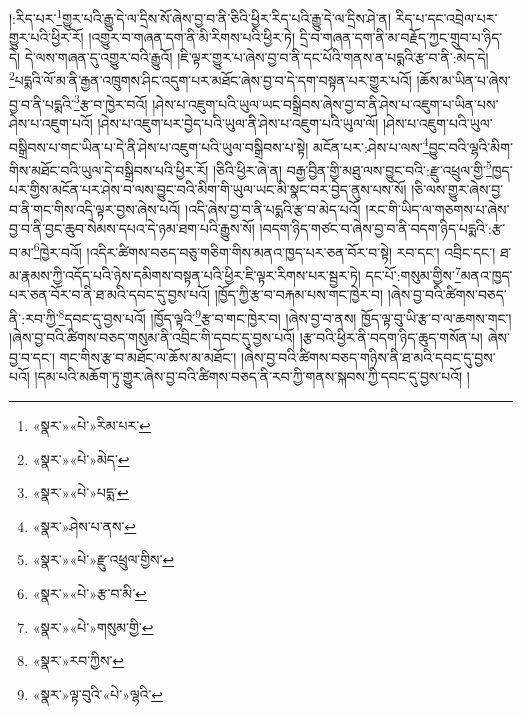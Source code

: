 །:རིད་པར་\footnote{«སྣར་»«པེ་»རིམ་པར་}གྱུར་པའི་རྒྱུ་དེ་ལ་དྲིས་སོ་ཞེས་བྱ་བ་ནི་ཅིའི་ཕྱིར་རིད་པའི་རྒྱུ་དེ་ལ་དྲིས་ཤེ་ན། རིད་པ་དང་འབྲེལ་པར་གྱུར་པའི་ཕྱིར་རོ། །འགྱུར་བ་གཞན་དག་ནི་མི་རིགས་པའི་ཕྱིར་ཏེ། དྲི་བ་གཞན་དག་ནི་མ་བརྗོད་ཀྱང་གྲུབ་པ་ཉིད་དེ། དེ་ལས་གཞན་དུ་འགྱུར་བའི་རྒྱུའོ། །ཇི་ལྟར་གྱུར་པ་ཞེས་བྱ་བ་ནི་དང་པོའི་གནས་ན་པདྨའི་རྩ་བ་ནི་:མེད་དེ། \footnote{«སྣར་»«པེ་»མེད་}པདྨའི་ལོ་མ་ནི་རྒྱན་འཁྲུགས་ཤིང་འདུག་པར་མཐོང་ཞེས་བྱ་བ་དེ་དག་བསྟན་པར་གྱུར་པའོ། །ཆོས་མ་ཡིན་པ་ཞེས་བྱ་བ་ནི་པདྨའི་\footnote{«སྣར་»«པེ་»པདྨ་}རྩ་བ་ཁྱེར་བའོ། །ཤེས་པ་འཇུག་པའི་ཡུལ་ཡང་བསྒྲིབས་ཞེས་བྱ་བ་ནི་ཤེས་པ་འཇུག་པ་ཡིན་པས་ཤེས་པ་འཇུག་པའོ། །ཤེས་པ་འཇུག་པར་བྱེད་པའི་ཡུལ་ནི་ཤེས་པ་འཇུག་པའི་ཡུལ་ལོ། །ཤེས་པ་འཇུག་པའི་ཡུལ་བསྒྲིབས་པ་གང་ཡིན་པ་དེ་ནི་ཤེས་པ་འཇུག་པའི་ཡུལ་བསྒྲིབས་པ་སྟེ། མངོན་པར་:ཤེས་པ་ལས་\footnote{«སྣར་»ཤེས་པ་ནས་}བྱུང་བའི་ལྷའི་མིག་གིས་མཐོང་བའི་ཡུལ་དེ་བསྒྲིབས་པའི་ཕྱིར་རོ། །ཅིའི་ཕྱིར་ཞེ་ན། བརྒྱ་བྱིན་གྱི་མཐུ་ལས་བྱུང་བའི་:རྫུ་འཕྲུལ་གྱི་\footnote{«སྣར་»«པེ་»རྫུ་འཕྲུལ་གྱིས་}ཁྱད་པར་གྱིས་མངོན་པར་ཤེས་བ་ལས་བྱུང་བའི་མིག་གི་ཡུལ་ཡང་མི་སྣང་བར་བྱེད་ནུས་པས་སོ། །ཅི་ལས་གྱུར་ཞེས་བྱ་བ་ནི་གང་གིས་འདི་ལྟར་བྱས་ཞེས་པའོ། །འདི་ཞེས་བྱ་བ་ནི་པདྨའི་རྩ་བ་མེད་པའོ། །རང་གི་ཡིད་ལ་གཅགས་པ་ཞེས་བྱ་བ་ནི་བྱང་ཆུབ་སེམས་དཔའ་དེ་ཉམ་ཐག་པའི་རྒྱུས་སོ། །བདག་ཉིད་གཙང་བ་ཞེས་བྱ་བ་ནི་བདག་ཉིད་པདྨའི་:རྩ་བ་མ་\footnote{«སྣར་»«པེ་»རྩ་བ་མི་}ཁྱེར་བའོ། །འདིར་ཚིགས་བཅད་བཅུ་གཅིག་གིས་མནའ་ཁྱད་པར་ཅན་བོར་བ་སྟེ། རབ་དང་། འབྲིང་དང་། ཐ་མ་རྣམས་ཀྱི་འདོད་པའི་ཉེས་དམིགས་བསྟན་པའི་ཕྱིར་ཇི་ལྟར་རིགས་པར་སྦྱར་ཏེ། དང་པོ་:གསུམ་གྱིས་\footnote{«སྣར་»«པེ་»གསུམ་གྱི་}མནའ་ཁྱད་པར་ཅན་བོར་བ་ནི་ཐ་མའི་དབང་དུ་བྱས་པའོ། །ཁྱོད་ཀྱི་རྩ་བ་བརྐམ་པས་གང་ཁྱེར་བ། །ཞེས་བྱ་བའི་ཚིགས་བཅད་ནི་:རབ་ཀྱི་\footnote{«སྣར་»རབ་ཀྱིས་}དབང་དུ་བྱས་པའོ། །ཁྱོད་ལྟའི་\footnote{«སྣར་»ལྟ་བུའི་«པེ་»ལྷའི་}རྩ་བ་གང་ཁྱེར་བ། །ཞེས་བྱ་བ་ནས། ཁྱོད་ལྟ་བུ་ཡི་རྩ་བ་ལ་ཆགས་གང་། །ཞེས་བྱ་བའི་ཚིགས་བཅད་གསུམ་ནི་འབྲིང་གི་དབང་དུ་བྱས་པའོ། །རྩ་བའི་ཕྱིར་ནི་བདག་ཉིད་ཆུད་གསོན་པ། ཞེས་བྱ་བ་དང་། གང་གིས་རྩ་བ་མཐོང་ལ་ཆོས་མ་མཐོང་། །ཞེས་བྱ་བའི་ཚིགས་བཅད་གཉིས་ནི་ཐ་མའི་དབང་དུ་བྱས་པའོ། །དམ་པའི་མཆོག་ཏུ་གྱུར་ཞེས་བྱ་བའི་ཚིགས་བཅད་ནི་རབ་ཀྱི་གནས་སྐབས་ཀྱི་དབང་དུ་བྱས་པའོ། །
